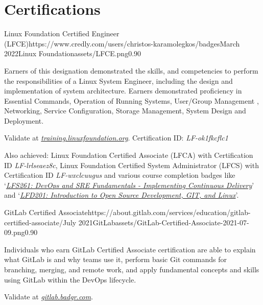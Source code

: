 \documentclass{mycv}
\begin{document}
	\section{Certifications}
    \begin{EntryDatedLogo}{Linux Foundation Certified Engineer (LFCE)}{https://www.credly.com/users/christos-karamolegkos/badges}{March 2022}{Linux Foundation}{assets/LFCE.png}{0.90}
		\begin{Itemize}
			\item Earners of this designation demonstrated the skills, and competencies to perform the responsibilities of a Linux System Engineer, including the design and implementation of system architecture. Earners demonstrated proficiency in Essential Commands, Operation of Running Systems, User/Group Management , Networking, Service Configuration, Storage Management, System Design and Deployment.
			\item Validate at \href{https://training.linuxfoundation.org/certification/verify-linux-certifications}{\textit{training.linuxfoundation.org}}. Certification ID: \textit{LF-ok1fkcflc1}
			\item Also achieved: Linux Foundation Certified Associate (LFCA) with Certification ID \textit{LF-lrlseaez8c}, Linux Foundation Certified System Administrator (LFCS) with Certification ID \textit{LF-wxclcuugus} and various course completion badges like `\href{https://www.credly.com/badges/19ff66ca-2e10-4e1b-90a9-1c1ac6132878}{\textit{LFS261: DevOps and SRE Fundamentals - Implementing Continuous Delivery}}' and   `\href{https://www.credly.com/badges/1fc7edfc-227e-4e93-ac46-297ab05c27db}{\textit{LFD201: Introduction to Open Source Development, GIT, and Linux}}'.
		\end{Itemize}
	\end{EntryDatedLogo}

	\vspace{0.5cm}

    \begin{EntryDatedLogo}{GitLab Certified Associate}{https://about.gitlab.com/services/education/gitlab-certified-associate/}{July 2021}{GitLab}{assets/GitLab-Certified-Associate-2021-07-09.png}{0.90}
		\begin{Itemize}
			\item Individuals who earn GitLab Certified Associate certification are able to explain what GitLab is and why teams use it, perform basic Git commands for branching, merging, and remote work, and apply fundamental concepts and skills using GitLab within the DevOps lifecycle.
			\item Validate at \href{https://gitlab.badgr.com/public/assertions/Hw6j8Th9SyKNj8ehsQkqAw}{\textit{gitlab.badgr.com}}.
		\end{Itemize}
	\end{EntryDatedLogo}
\end{document}
